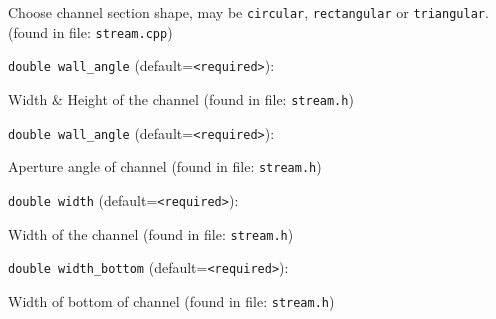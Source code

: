 Choose channel section shape, may be {\tt circular},
 {\tt rectangular} or {\tt triangular}.
 (found in file: \verb+stream.cpp+)
\item\verb+double wall_angle+ {\rm(default=\verb|<required>|)}:

Width & Height of the channel
 (found in file: \verb+stream.h+)
\item\verb+double wall_angle+ {\rm(default=\verb|<required>|)}:

Aperture angle of channel
 (found in file: \verb+stream.h+)
\item\verb+double width+ {\rm(default=\verb|<required>|)}:

Width of the channel
 (found in file: \verb+stream.h+)
\item\verb+double width_bottom+ {\rm(default=\verb|<required>|)}:

Width of bottom of channel
 (found in file: \verb+stream.h+)
